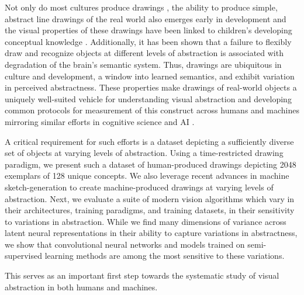 \documentclass[10pt,letterpaper]{article}
\begin{document}
Not only do most cultures produce drawings \cite{gombrich1995story}, the ability to produce simple, abstract line drawings of the real world also emerges early in development \cite{karmiloff1990constraints, dillon2021rooms, long2021parallel} and the visual properties of these drawings have been linked to children's developing conceptual knowledge \cite{tversky1989parts,huey2022developmental}. Additionally, it has been shown that a failure to flexibly draw \cite{bozeat2003duck} and recognize \cite{rogers2007object} objects at different levels of abstraction is associated with degradation of the brain's semantic system.
Thus, drawings are ubiquitous in culture and development, a window into learned semantics, and exhibit variation in perceived abstractness.
These properties make drawings of real-world objects a uniquely well-suited vehicle for understanding visual abstraction and developing common protocols for measurement of this construct across humans and machines mirroring similar efforts in cognitive science and AI \cite{bear2021physion}.

A critical requirement for such efforts is a dataset depicting a sufficiently diverse set of objects at varying levels of abstraction. Using a time-restricted drawing paradigm, we present such a dataset of human-produced drawings depicting 2048 exemplars of 128 unique concepts. We also leverage recent advances in machine sketch-generation \cite{vinker2022clipasso} to create machine-produced drawings at varying levels of abstraction. Next, we evaluate a suite of modern vision algorithms which vary in their architectures, training paradigms, and training datasets, in their sensitivity to variations in abstraction. While we find many dimensions of variance across latent neural representations in their ability to capture variations in abstractness, we show that convolutional neural networks and models trained on semi-supervised learning methods are among the most sensitive to these variations.

This serves as an important first step towards the systematic study of visual abstraction in both humans and machines.

\end{document}
